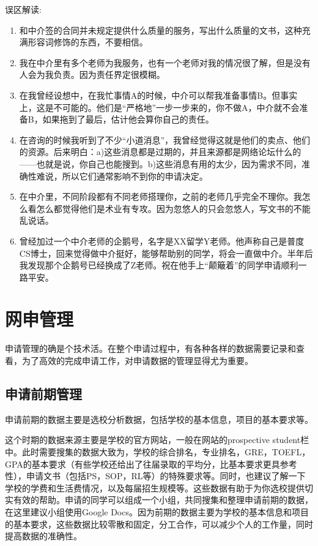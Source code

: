 误区解读:
\begin{enumerate}
\item 和中介签的合同并未规定提供什么质量的服务，写出什么质量的文书，这种充满形容词修饰的东西，不要相信。
\item 我在中介里有多个老师为我服务，也有一个老师对我的情况很了解，但是没有人会为我负责。因为责任界定很模糊。
\item 在我曾经设想中，在我忙事情A的时候，中介可以帮我准备事情B。但事实上，这是不可能的。他们是“严格地”一步一步来的，你不做A，中介就不会准备B，如果拖到了最后，估计他会算你自己的责任。
\item 在咨询的时候我听到了不少“小道消息”，我曾经觉得这就是他们的卖点、他们的资源。后来明白：a)这些消息都是过期的，并且来源都是网络论坛什么的——也就是说，你自己也能搜到。b)这些消息有用的太少，因为需求不同，准确性难说，所以它们通常影响不到你的申请决定。
\item 在中介里，不同阶段都有不同老师搭理你，之前的老师几乎完全不理你。我怎么看怎么都觉得他们是术业有专攻。因为忽悠人的只会忽悠人，写文书的不能乱说话。
\item 曾经加过一个中介老师的企鹅号，名字是XX留学Y老师。他声称自己是普度CS博士，回来觉得做中介挺好，能够帮助别的同学，将会一直做中介。半年后我发现那个企鹅号已经换成了Z老师。祝在他手上“颠簸着”的同学申请顺利一路平安。
\end{enumerate}


\section{网申管理}
申请管理的确是个技术活。在整个申请过程中，有各种各样的数据需要记录和查看，为了高效的完成申请工作，对申请数据的管理显得尤为重要。

\subsection{申请前期管理}
   申请前期的数据主要是选校分析数据，包括学校的基本信息，项目的基本要求等。\par
   这个时期的数据来源主要是学校的官方网站，一般在网站的prospective student栏中。此时需要搜集的数据大致为，学校的综合排名，专业排名，GRE，TOEFL，GPA的基本要求（有些学校还给出了往届录取的平均分，比基本要求更具参考性），申请文书（包括PS，SOP，RL等）的特殊要求等。同时，也建议了解一下学校的学费和生活费情况，以及每届招生规模等。这些数据有助于为你选校提供切实有效的帮助。申请的同学可以组成一个小组，共同搜集和整理申请前期的数据，在这里建议小组使用Google Docs。因为前期的数据主要为学校的基本信息和项目的基本要求，这些数据比较零散和固定，分工合作，可以减少个人的工作量，同时提高数据的准确性。


